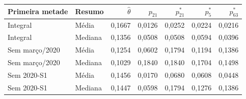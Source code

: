 \begin{tabular}{llrrrrr}
\toprule
Primeira metade & Resumo & $\widehat\theta$ & $p_{21}$ & $p^*_{21}$ & $p^*_{5}$ & $p^*_{63}$\\
\midrule
Integral & Média & 0,1667 & 0,0126 & 0,0252 & 0,0224 & 0,0216\\
Integral & Mediana & 0,1356 & 0,0508 & 0,0508 & 0,0594 & 0,0396\\
Sem março/2020 & Média & 0,1254 & 0,0602 & 0,1794 & 0,1194 & 0,1386\\
Sem março/2020 & Mediana & 0,1029 & 0,1840 & 0,1840 & 0,1704 & 0,1498\\
Sem 2020-S1 & Média & 0,1456 & 0,0170 & 0,0680 & 0,0608 & 0,0448\\
Sem 2020-S1 & Mediana & 0,1447 & 0,0598 & 0,1794 & 0,1276 & 0,1386\\
\bottomrule
\end{tabular}
